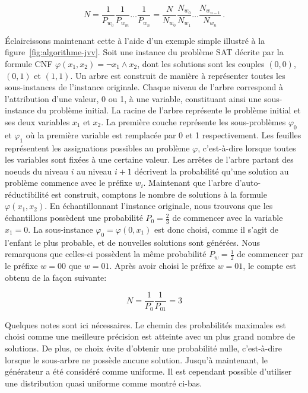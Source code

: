 \begin{equation}
    N = \frac{1}{P_{w_{0}}} \frac{1}{P_{w_{m}}} \dots \frac{1}{P_{w_{n}}} = \frac{N}{N_{w_{0}}} \frac{N_{w_{0}}}{N_{w_{1}}} \dots \frac{N_{w_{n-1}}}{N_{w_{n}}} \,.
\end{equation}

Éclaircissons maintenant cette à l'aide d'un exemple simple illustré à la figure~\ref{fig:algorithme-jvv}. Soit une instance du problème SAT décrite par la formule CNF $\varphi(x_{1}, x_{2}) = \neg x_{1} \land x_{2}$, dont les solutions sont les couples $(0,0)$, $(0,1)$ et $(1,1)$. Un arbre est construit de manière à représenter toutes les sous-instances de l'instance originale. Chaque niveau de l'arbre correspond à l'attribution d'une valeur, 0 ou 1, à une variable, constituant ainsi une sous-instance du problème initial. La racine de l'arbre représente le problème initial et ses deux variables $x_{1}$ et $x_{2}$. La première couche représente les sous-problèmes $\varphi_{0}$ et $\varphi_{1}$ où la première variable est remplacée par 0 et 1 respectivement. Les feuilles représentent les assignations possibles au problème $\varphi$, c'est-à-dire lorsque toutes les variables sont fixées à une certaine valeur. Les arrêtes de l'arbre partant des noeuds du niveau $i$ au niveau $i+1$ décrivent la probabilité qu'une solution au problème commence avec le préfixe $w_{i}$. Maintenant que l'arbre d'auto-réductibilité est construit, comptons le nombre de solutions à la formule $\varphi(x_{1}, x_{2})$. En échantillonnant l'instance originale, nous trouvons que les échantillons possèdent une probabilité $P_{0}=\frac{2}{3}$ de commencer avec la variable $x_{1} = 0$. La sous-instance $\varphi_{0} = \varphi(0, x_{1})$ est donc choisi, comme il s'agit de l'enfant le plus probable, et de nouvelles solutions sont générées. Nous remarquons que celles-ci possèdent la même probabilité $P_{w}=\frac{1}{2}$ de commencer par le préfixe $w=00$ que $w=01$. Après avoir choisi le préfixe $w=01$, le compte est obtenu de la façon suivante:

\begin{equation}
   N = \frac{1}{P_{0}} \frac{1}{P_{01}} = 3
\end{equation}
  

Quelques notes sont ici nécessaires. Le chemin des probabilités maximales est choisi comme une meilleure précision est atteinte avec un plus grand nombre de solutions. De plus, ce choix évite d'obtenir une probabilité nulle, c'est-à-dire lorsque le sous-arbre ne possède aucune solution.
Jusqu'à maintenant, le générateur a été considéré comme uniforme. Il est cependant possible d'utiliser une distribution quasi uniforme comme montré ci-bas. 

